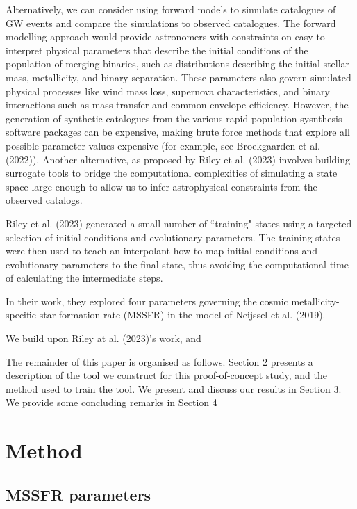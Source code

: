 \documentclass[twocolumn]{aastex631}
\begin{document}
Alternatively, we can consider using forward models to simulate catalogues of GW events and compare the simulations to observed catalogues.
The forward modelling approach would provide astronomers with constraints on easy-to-interpret physical parameters that describe the initial conditions of the population of merging binaries, such as distributions describing the initial stellar mass, metallicity, and binary separation.
These parameters also govern simulated physical processes like wind mass loss, supernova characteristics, and binary interactions such as mass transfer and common envelope efficiency.
However, the generation of synthetic catalogues from the various rapid population sysnthesis software packages can be expensive, making brute force methods that explore all possible parameter values expensive (for example, see  Broekgaarden et al. (2022)).
Another alternative, as proposed by Riley et al. (2023) involves building surrogate tools to bridge the computational complexities of simulating a state space large enough
to allow us to infer astrophysical constraints from the observed catalogs.

Riley et al. (2023) generated a small number of ``training" states using a
targeted selection of initial conditions and evolutionary
parameters.
The training states were then used to teach an interpolant how to
map initial conditions and evolutionary parameters to
the final state, thus avoiding the computational time
of calculating the intermediate steps.

In their work, they explored four parameters governing the cosmic metallicity-specific star formation rate (MSSFR) in the model of Neijssel et al. (2019).

We build upon Riley at al. (2023)'s work, and

The remainder of this paper is organised as follows.
Section 2 presents a description of the tool we construct
for this proof-of-concept study, and the method used
to train the tool.
We present and discuss our results in Section 3.
We provide some concluding remarks in  Section 4



\section{Method}


\subsection{MSSFR parameters}\label{sec:method_parameters}
\end{document}
